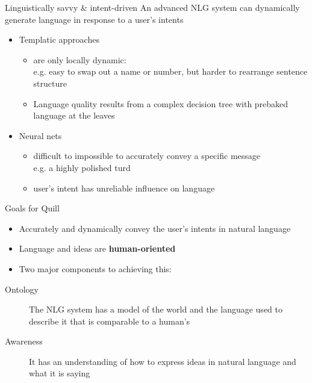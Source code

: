 \documentclass[10pt, compress]{beamer}
\begin{document}
\begin{frame}{Linguistically savvy \& intent-driven}
	An advanced NLG system can dynamically generate language in response to a user's intents

	\begin{itemize}
		\item Templatic approaches
		\begin{itemize} 
			\item are only locally dynamic:\\
				e.g. easy to swap out a name or number, but harder to rearrange sentence structure
			\item Language quality results from a complex decision tree with prebaked language at the leaves
		\end{itemize}

		\item Neural nets
		\begin{itemize}
			\item difficult to impossible to accurately convey a specific message\\ \pause
				e.g. a highly polished turd
			\item user's intent has unreliable influence on language
		\end{itemize}
	\end{itemize}
\end{frame}

\begin{frame}{Goals for Quill}
	\begin{itemize}
		\item Accurately and dynamically convey the user's intents in natural language 
		\item Language and ideas are \textbf{human-oriented} \pause
		\item Two major components to achieving this:
	\end{itemize}

	\begin{description}
		\item[Ontology] The NLG system has a model of the world and the language used to describe it that is comparable to a human's \pause
		\item[Awareness] It has an understanding of how to express ideas in natural language and what it is saying
	\end{description}
\end{frame}
\end{document}
